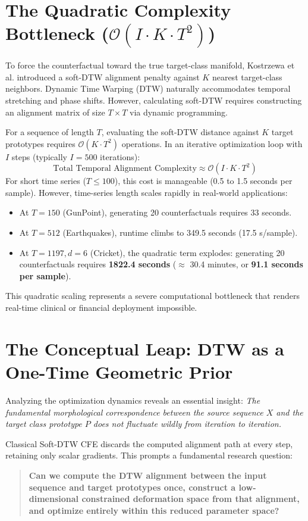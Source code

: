 \documentclass[11pt,a4paper]{report}
\begin{document}
\section{The Quadratic Complexity Bottleneck ($\mathcal{O}(I \cdot K \cdot T^2)$)}
To force the counterfactual toward the true target-class manifold, Kostrzewa et al. \cite{kostrzewa2026towards} introduced a soft-DTW alignment penalty against $K$ nearest target-class neighbors. Dynamic Time Warping (DTW) naturally accommodates temporal stretching and phase shifts. However, calculating soft-DTW requires constructing an alignment matrix of size $T \times T$ via dynamic programming.

For a sequence of length $T$, evaluating the soft-DTW distance against $K$ target prototypes requires $\mathcal{O}(K \cdot T^2)$ operations. In an iterative optimization loop with $I$ steps (typically $I = 500$ iterations):
\begin{equation}
    \text{Total Temporal Alignment Complexity} \approx \mathcal{O}(I \cdot K \cdot T^2)
\end{equation}
For short time series ($T \le 100$), this cost is manageable (0.5 to 1.5 seconds per sample). However, time-series length scales rapidly in real-world applications:
\begin{itemize}
    \item At $T=150$ (GunPoint), generating 20 counterfactuals requires 33 seconds.
    \item At $T=512$ (Earthquakes), runtime climbs to 349.5 seconds (17.5 s/sample).
    \item At $T=1197, d=6$ (Cricket), the quadratic term explodes: generating 20 counterfactuals requires \textbf{1822.4 seconds} ($\approx$ 30.4 minutes, or \textbf{91.1 seconds per sample}).
\end{itemize}

This quadratic scaling represents a severe computational bottleneck that renders real-time clinical or financial deployment impossible.

\section{The Conceptual Leap: DTW as a One-Time Geometric Prior}
Analyzing the optimization dynamics reveals an essential insight: \textit{The fundamental morphological correspondence between the source sequence $X$ and the target class prototype $P$ does not fluctuate wildly from iteration to iteration.}

Classical Soft-DTW CFE discards the computed alignment path at every step, retaining only scalar gradients. This prompts a fundamental research question:
\begin{quote}
    \textbf{Can we compute the DTW alignment between the input sequence and target prototypes once, construct a low-dimensional constrained deformation space from that alignment, and optimize entirely within this reduced parameter space?}
\end{quote}
\end{document}
